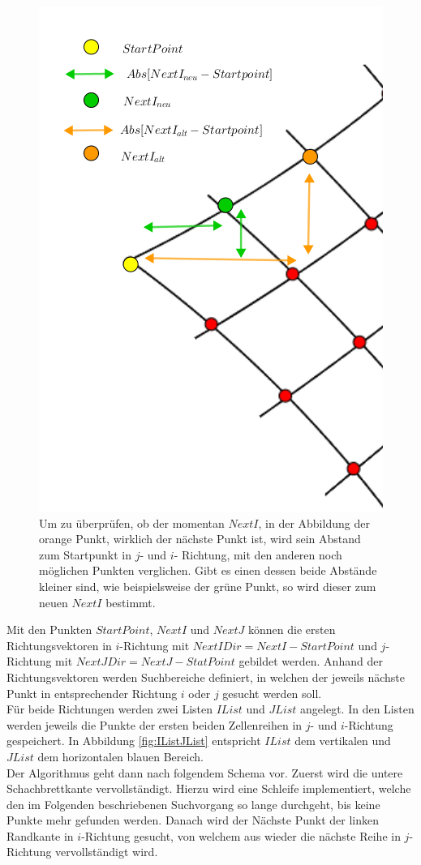 \begin{figure}[!htb]
	\centering
	\includegraphics[width=0.5\linewidth]{images/SearchNextI.png}
	\caption[Überprüfung des gefundenen $NextI$]{Um zu überprüfen, ob der momentan $NextI$, in der Abbildung der orange Punkt, wirklich der nächste Punkt ist, wird sein Abstand zum Startpunkt in $j$- und  $i$- Richtung, mit den anderen noch möglichen Punkten verglichen. Gibt es einen dessen beide Abstände kleiner sind, wie beispielsweise der grüne Punkt, so wird dieser zum neuen $NextI$ bestimmt.}
	\label{fig:FindNextIJ}
\end{figure}
\pagebreak


Mit den Punkten $StartPoint$, $NextI$ und $NextJ$ können die ersten Richtungsvektoren in $i$-Richtung mit $NextIDir= NextI - StartPoint$ und $j$- Richtung mit $NextJDir =NextJ-StatPoint$ gebildet werden. Anhand der Richtungsvektoren werden Suchbereiche definiert, in welchen der jeweils nächste Punkt in entsprechender Richtung $i$ oder $j$ gesucht werden soll.\\ 


Für beide Richtungen werden zwei Listen $IList$ und $JList$ angelegt. In den Listen werden jeweils die Punkte der ersten beiden Zellenreihen in $j$- und $i$-Richtung gespeichert. In Abbildung \ref{fig:IListJList} entspricht $IList$ dem vertikalen und $JList$ dem horizontalen blauen Bereich. \\


Der Algorithmus geht dann nach folgendem Schema vor. Zuerst wird die untere Schachbrettkante vervollständigt. Hierzu wird eine Schleife implementiert, welche den im Folgenden beschriebenen Suchvorgang so lange durchgeht, bis keine Punkte mehr gefunden werden. Danach wird der Nächste Punkt der linken Randkante in $i$-Richtung gesucht, von welchem aus wieder die nächste Reihe in $j$-Richtung vervollständigt wird.\\

